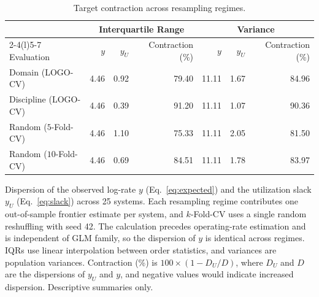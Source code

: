 \documentclass{article}
\begin{document}
\begin{table}[H]
\begin{minipage}{\linewidth}
\end{minipage}
\end{table}

\clearpage
\begin{table}[H]
\centering
\footnotesize
\captionsetup{position=top,skip=12pt}
\caption{Target contraction across resampling regimes.}
\label{tab:si-contraction}
\begin{tabularx}{\linewidth}{@{}Xrrrrrr@{}}
\toprule
 & \multicolumn{3}{c}{Interquartile Range} & \multicolumn{3}{c}{Variance} \\
\cmidrule(lr){2-4}\cmidrule(l){5-7}
Evaluation & $y$ & $y_U$ & Contraction (\%) & $y$ & $y_U$ & Contraction (\%) \\
\midrule
Domain (LOGO-CV) & 4.46 & 0.92 & 79.40 & 11.11 & 1.67 & 84.96 \\
Discipline (LOGO-CV) & 4.46 & 0.39 & 91.20 & 11.11 & 1.07 & 90.36 \\
Random ($5$-Fold-CV) & 4.46 & 1.10 & 75.33 & 11.11 & 2.05 & 81.50 \\
Random ($10$-Fold-CV) & 4.46 & 0.69 & 84.51 & 11.11 & 1.78 & 83.97 \\
\bottomrule
\end{tabularx}
\par\vspace{12pt}
\begin{minipage}{\linewidth}
\footnotesize
Dispersion of the observed log-rate $y$ (Eq.~\eqref{eq:expected}) and the utilization slack $y_U$ (Eq.~\eqref{eq:slack}) across 25 systems. Each resampling regime contributes one out-of-sample frontier estimate per system, and $k$-Fold-CV uses a single random reshuffling with seed 42. The calculation precedes operating-rate estimation and is independent of GLM family, so the dispersion of $y$ is identical across regimes. IQRs use linear interpolation between order statistics, and variances are population variances. Contraction (\%) is $100 \times (1 - D_U / D)$, where $D_U$ and $D$ are the dispersions of $y_U$ and $y$, and negative values would indicate increased dispersion. Descriptive summaries only.
\end{minipage}
\end{table}
\end{document}
